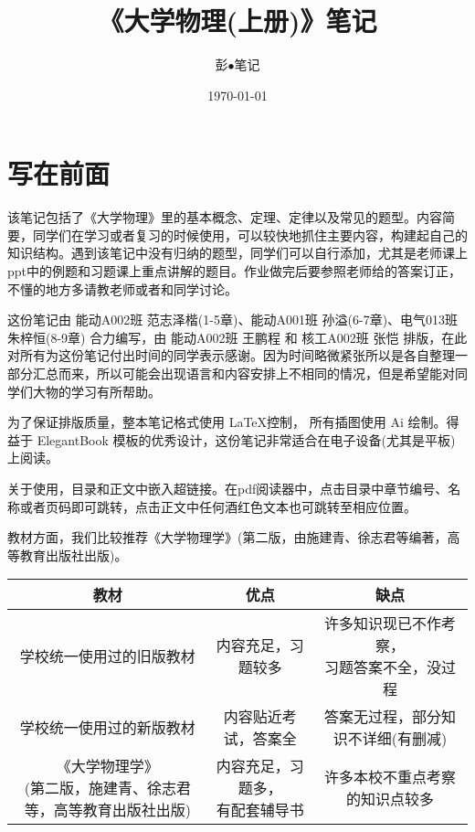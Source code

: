 \documentclass[cn,10pt,toc=twocol,device=pad,citestyle=gb7714-2015,bibstyle=gb7714-2015]{elegantbook}
\title{《大学物理(上册)》笔记}
\subtitle{彭$\bullet$笔记}
\date{\today}
\begin{document}
\maketitle
\frontmatter

\chapter*{写在前面}


该笔记包括了《大学物理》里的基本概念、定理、定律以及常见的题型。内容简要，同学们在学习或者复习的时候使用，可以较快地抓住主要内容，构建起自己的知识结构。遇到该笔记中没有归纳的题型，同学们可以自行添加，尤其是老师课上ppt中的例题和习题课上重点讲解的题目。作业做完后要参照老师给的答案订正，不懂的地方多请教老师或者和同学讨论。

\vskip 0.3cm

这份笔记由 能动A002班 范志泽楷(1-5章)、能动A001班 孙溢(6-7章)、电气013班 朱梓恒(8-9章) 合力编写，由 能动A002班 王鹏程 和 核工A002班 张恺 排版，在此对所有为这份笔记付出时间的同学表示感谢。因为时间略微紧张所以是各自整理一部分汇总而来，所以可能会出现语言和内容安排上不相同的情况，但是希望能对同学们大物的学习有所帮助。

\vskip 0.3cm

为了保证排版质量，整本笔记格式使用 \LaTeX 控制， 所有插图使用 Ai 绘制。得益于 ElegantBook 模板的优秀设计，这份笔记非常适合在电子设备(尤其是平板)上阅读。

\vskip 0.3cm

关于使用，目录和正文中嵌入超链接。在pdf阅读器中，点击目录中章节编号、名称或者页码即可跳转，点击正文中任何酒红色文本也可跳转至相应位置。

\vskip 0.3cm

教材方面，我们比较推荐《大学物理学》(第二版，由施建青、徐志君等编著，高等教育出版社出版)。

\begin{table}[H]
	\centering
	\footnotesize
	\begin{tabular}{ccc}
		\toprule[1pt]
		教材 & 优点 & 缺点 \\
		\hline
		学校统一使用过的旧版教材 & 内容充足，习题较多 & \makecell*[c]{许多知识现已不作考察，\\ 习题答案不全，没过程} \\
		\hline
		学校统一使用过的新版教材 & 内容贴近考试，答案全 & 答案无过程，部分知识不详细(有删减) \\
		\hline
		\makecell*[c]{《大学物理学》 \\ (第二版，施建青、徐志君等，高等教育出版社出版)} & \makecell*[c]{内容充足，习题多，\\ 有配套辅导书} & 许多本校不重点考察的知识点较多 \\
		\bottomrule[1pt]
	\end{tabular}
\end{table}
\end{document}
